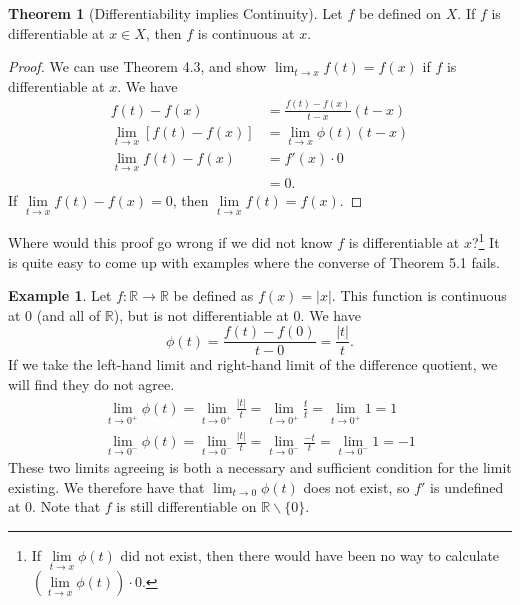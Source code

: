 \documentclass{article}
\newcommand{\R}{\mathbb{R}}
\theoremstyle{definition}
\newtheorem{theorem}{Theorem}[section]
\newtheorem{example}{Example}[section]
\begin{document}
\begin{theorem}[Differentiability implies Continuity]
	Let $ f $ be defined on $  X $. If $ f $ is differentiable at $ x\in  X $, then $ f $ is continuous at $ x $.  
\end{theorem}
\begin{proof}
	We can use Theorem 4.3, and show $ \lim_{t\to x}f(t)=f(x) $ if $ f $ is differentiable at $ x $. We have
	\begin{align*}
	f(t)-f(x)&=\frac{f(t)-f(x)}{t-x}(t-x)\\
	\lim\limits_{t\to x}[f(t)-f(x)]&=\lim\limits_{t\to x}\phi(t)(t-x)\\\lim\limits_{t\to x}f(t)-f(x)&=f'(x)\cdot 0\\&=0.
	\end{align*}
	If $ \lim\limits_{t\to x}f(t)-f(x)=0 $, then $ \lim\limits_{t\to x}f(t)=f(x) $. 
\end{proof}
Where would this proof go wrong if we did not know $ f $ is differentiable at $ x $?\footnote{ If $ \lim\limits_{t\to x}\phi(t) $ did not exist, then there would have been no way to calculate $ (\lim\limits_{t\to x}\phi(t))\cdot 0 $. } It is quite easy to come up with examples where the converse of Theorem 5.1 fails. 
\begin{example}
	Let $ f:\R\to\R $ be defined as $ f(x)=|x| $. This function is continuous at $ 0 $ (and all of $ \R $), but is not differentiable at $ 0 $. We have $$\phi(t)=\frac{f(t)-f(0)}{t-0}=\frac{|t|}{t} .$$ If we take the left-hand limit and right-hand limit of the difference quotient, we will find they do not agree.
	\begin{align*}
		\lim\limits_{t\to 0^+}\phi(t)=\lim\limits_{t\to 0^+}\frac{|t|}{t}=\lim\limits_{t\to 0^+}\frac{t}{t}=\lim\limits_{t\to 0^+}1=1\\\lim\limits_{t\to 0^-}\phi(t)=\lim\limits_{t\to 0^-}\frac{|t|}{t}=\lim\limits_{t\to 0^-}\frac{-t}{t}=\lim\limits_{t\to 0^-}1=-1
	\end{align*}
	These two limits agreeing is both a necessary and sufficient condition for the limit existing. We therefore have that $ \lim_{t\to 0}\phi(t) $ does not exist, so $ f' $ is undefined at $ 0 $. Note that $ f $ is still differentiable on $ \R\backslash\{0\} $. 
\end{example} 
\end{document}
